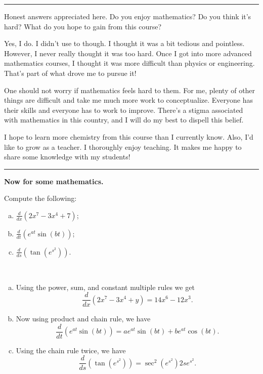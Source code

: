 \documentclass[12pt]{article} %
\begin{document}
\hrule

\begin{question}
    Honest answers appreciated here.  Do you enjoy mathematics? Do you think it's hard? What do you hope to gain from this course?
\end{question}

\begin{answer}
    Yes, I do.  I didn't use to though.  I thought it was a bit tedious and pointless.  However, I never really thought it was too hard. Once I got into more advanced mathematics courses, I thought it was more difficult than physics or engineering. That's part of what drove me to pursue it! 
    
    One should not worry if mathematics feels hard to them.  For me, plenty of other things are difficult and take me much more work to conceptualize. Everyone has their skills and everyone has to work to improve.  There's a stigma associated with mathematics in this country, and I will do my best to dispell this belief. 
    
    I hope to learn more chemistry from this course than I currently know. Also, I'd like to grow as a teacher.  I thoroughly enjoy teaching. It makes me happy to share some knowledge with my students!
    
\end{answer}

\hrule

\begin{center}
    \textbf{Now for some mathematics.}
\end{center}

\begin{problem}
    Compute the following:
\begin{enumerate}[(a)]
    \item $\displaystyle{\frac{d}{dx}(2x^7-3x^4+7)}$;
    \item $\displaystyle{\frac{d}{dt}\left(e^{at}\sin(bt)\right)}$;
    \item $\displaystyle{\frac{d}{ds}\left(\tan\left( e^{s^2}\right)\right)}$.
\end{enumerate}
\end{problem}

\begin{solution}~
\begin{enumerate}[(a)]
    \item Using the power, sum, and constant multiple rules we get
    \[
    \frac{d}{dx}\left( 2x^7 -3x^4 +y\right) = 14x^6-12x^3.
    \]
    \item Now using product and chain rule, we have
    \[
    \frac{d}{dt}\left( e^{at}\sin(bt)\right)= ae^{at}\sin(bt)+be^{at}\cos(bt).
    \]
    \item Using the chain rule twice, we have
    \[
    \frac{d}{ds} \left( \tan\left( e^{s^2}\right)\right) = \sec^2\left(e^{s^2}\right)2se^{s^2}.
    \]
\end{enumerate}
\end{solution}
\end{document}
